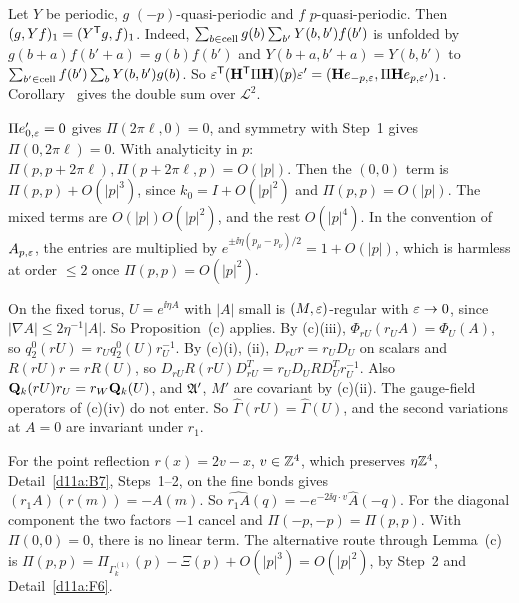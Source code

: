 \begin{detail}\label{d11a:F8}
\begin{step}[Grouping]
Let $Y$ be periodic, $g$ $(-p)$-quasi-periodic and $f$ $p$-quasi-periodic. Then $(g,Yf)_1=(Y^{\sf T}g,f)_1$. Indeed, $\sum_{b\in{\rm cell}}g(b)\sum_{b'}Y(b,b')f(b')$ is unfolded by $g(b+a)f(b'+a)=g(b)f(b')$ and $Y(b+a,b'+a)=Y(b,b')$ to $\sum_{b'\in{\rm cell}}f(b')\sum_bY(b,b')g(b)$. So $\varepsilon^{\sf T}(\mathbf H^{\sf T}\Pi\mathbf H)(p)\varepsilon'=(\mathbf H e_{-p,\varepsilon},\Pi\mathbf H e_{p,\varepsilon'})_1$. Corollary~ gives the double sum over $\mathcal L^2$.
\end{step}
\begin{step}[Orders]
$\Pi e'_{0,\varepsilon}=0$ gives $\Pi(2\pi\ell,0)=0$, and symmetry with Step~1 gives $\Pi(0,2\pi\ell)=0$. With analyticity in $p$: $\Pi(p,p+2\pi\ell),\Pi(p+2\pi\ell,p)=O(|p|)$. Then the $(0,0)$ term is $\Pi(p,p)+O(|p|^3)$, since $k_0=I+O(|p|^2)$ and $\Pi(p,p)=O(|p|)$. The mixed terms are $O(|p|)O(|p|^2)$, and the rest $O(|p|^4)$. In the convention of $A_{p,\varepsilon}$, the entries are multiplied by $e^{\pm\ii\eta(p_\mu-p_\nu)/2}=1+O(|p|)$, which is harmless at order $\le2$ once $\Pi(p,p)=O(|p|^2)$.
\end{step}
\begin{step}
On the fixed torus, $U=e^{\ii\eta A}$ with $|A|$ small is $(M,\varepsilon)$-regular with $\varepsilon\to0$, since $|\nabla A|\le2\eta^{-1}|A|$. So Proposition~(c) applies. By (c)(iii), $\Phi_{rU}(r_UA)=\Phi_U(A)$, so $q_2^0(rU)=r_Uq_2^0(U)r_U^{-1}$. By (c)(i), (ii), $D_{rU}r=r_UD_U$ on scalars and $R(rU)r=rR(U)$, so $D_{rU}R(rU)D_{rU}^T=r_UD_URD_U^Tr_U^{-1}$. Also $\mathbf Q_k(rU)r_U=r_W\mathbf Q_k(U)$, and $\mathfrak A'$, $M'$ are covariant by (c)(ii). The gauge-field operators of (c)(iv) do not enter. So $\widehat\Gamma(rU)=\widehat\Gamma(U)$, and the second variations at $A=0$ are invariant under $r_1$.
\end{step}
\begin{step}
For the point reflection $r(x)=2v-x$, $v\in\mathbb Z^4$, which preserves $\eta\mathbb Z^4$, Detail~\ref{d11a:B7}, Steps~1--2, on the fine bonds gives $(r_1A)(r(m))=-A(m)$. So $\widehat{r_1A}(q)=-e^{-2\ii q\cdot v}\hat A(-q)$. For the diagonal component the two factors $-1$ cancel and $\Pi(-p,-p)=\Pi(p,p)$. With $\Pi(0,0)=0$, there is no linear term. The alternative route through Lemma~(c) is $\Pi(p,p)=\Pi_{\Gamma^{(1)}_k}(p)-\Xi(p)+O(|p|^3)=O(|p|^2)$, by Step~2 and Detail~\ref{d11a:F6}.
\end{step}
\end{detail}

